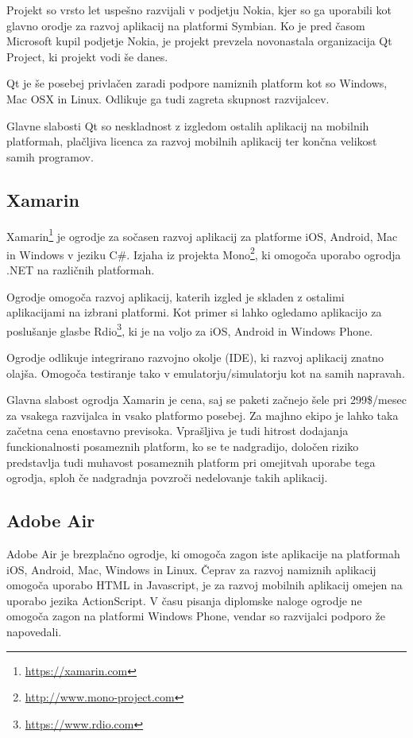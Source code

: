 Projekt so vrsto let uspešno razvijali v podjetju Nokia, kjer so ga uporabili kot glavno orodje za razvoj aplikacij na platformi Symbian. Ko je pred časom Microsoft kupil podjetje Nokia, je projekt prevzela novonastala organizacija Qt Project, ki projekt vodi še danes.

Qt je še posebej privlačen zaradi podpore namiznih platform kot so Windows, Mac OSX in Linux. Odlikuje ga tudi zagreta skupnost razvijalcev.

Glavne slabosti Qt so neskladnost z izgledom ostalih aplikacij na mobilnih platformah, plačljiva licenca za razvoj mobilnih aplikacij ter končna velikost samih programov.

\subsection{Xamarin}

Xamarin\footnote{\href{https://xamarin.com}{https://xamarin.com}} je ogrodje za sočasen razvoj aplikacij za platforme iOS, Android, Mac in Windows v jeziku C\#. Izjaha iz projekta Mono\footnote{\href{http://www.mono-project.com}{http://www.mono-project.com}}, ki omogoča uporabo ogrodja .NET na različnih platformah.

Ogrodje omogoča razvoj aplikacij, katerih izgled je skladen z ostalimi aplikacijami na izbrani platformi. Kot primer si lahko ogledamo aplikacijo za poslušanje glasbe Rdio\footnote{\href{https://www.rdio.com}{https://www.rdio.com}}, ki je na voljo za iOS, Android in Windows Phone.

Ogrodje odlikuje integrirano razvojno okolje (IDE), ki razvoj aplikacij znatno olajša. Omogoča testiranje tako v emulatorju/simulatorju kot na samih napravah.

Glavna slabost ogrodja Xamarin je cena, saj se paketi začnejo šele pri 299\$/mesec za vsakega razvijalca in vsako platformo posebej. Za majhno ekipo je lahko taka začetna cena enostavno previsoka. Vprašljiva je tudi hitrost dodajanja funckionalnosti posameznih platform, ko se te nadgradijo, določen riziko predstavlja tudi muhavost posameznih platform pri omejitvah uporabe tega ogrodja, sploh če nadgradnja povzroči nedelovanje takih aplikacij.

\subsection{Adobe Air}

Adobe Air je brezplačno ogrodje, ki omogoča zagon iste aplikacije na platformah iOS, Android, Mac, Windows in Linux. Čeprav za razvoj namiznih aplikacij omogoča uporabo HTML in Javascript, je za razvoj mobilnih aplikacij omejen na uporabo jezika ActionScript. V času pisanja diplomske naloge ogrodje ne omogoča zagon na platformi Windows Phone, vendar so razvijalci podporo že napovedali.

